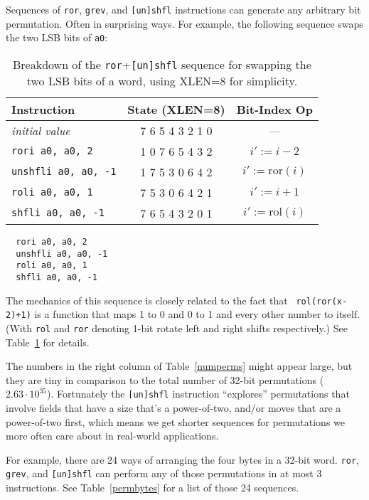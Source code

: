 Sequences of {\tt ror}, {\tt grev}, and {\tt [un]shfl} instructions can
generate any arbitrary bit permutation. Often in surprising ways. For example,
the following sequence swaps the two LSB bits of {\tt a0}:

\begin{table}[t]
\begin{center}
\begin{tabular}{l|c|c}
Instruction & State (XLEN=8) & Bit-Index Op \\
\hline
{\it initial value}      & 7 6 5 4 3 2 1 0 & --- \\
{\tt rori a0, a0, 2}     & 1 0 7 6 5 4 3 2 & $i' := i-2$ \\
{\tt unshfli a0, a0, -1} & 1 7 5 3 0 6 4 2 & $i' := \mathrm{ror}(i)$ \\
{\tt roli a0, a0, 1}     & 7 5 3 0 6 4 2 1 & $i' := i+1$ \\
{\tt shfli a0, a0, -1}   & 7 6 5 4 3 2 0 1 & $i' := \mathrm{rol}(i)$ \\
\end{tabular}
\end{center}
\caption{Breakdown of the {\tt ror}+{\tt [un]shfl} sequence for swapping the
two LSB bits of a word, using XLEN=8 for simplicity.}
\label{permdemo}
\end{table}

\begin{minipage}{\linewidth}
\begin{verbatim}
  rori a0, a0, 2
  unshfli a0, a0, -1
  roli a0, a0, 1
  shfli a0, a0, -1
\end{verbatim}
\end{minipage}

The mechanics of this sequence is closely related to the fact that {\tt
rol(ror(x-2)+1)} is a function that maps 1 to 0 and 0 to 1 and every other
number to itself. (With {\tt rol} and {\tt ror} denoting 1-bit rotate left and
right shifts respectively.) See Table~\ref{permdemo} for details.

The numbers in the right column of Table~\ref{numperms} might appear large,
but they are tiny in comparison to the total number of 32-bit permutations
($2.63\cdot10^{35}$). Fortunately the {\tt [un]shfl} instruction ``explores''
permutations that involve fields that have a size that's a power-of-two,
and/or moves that are a power-of-two first, which means we get shorter sequences
for permutations we more often care about in real-world applications.

For example, there are 24 ways of arranging the four bytes in a 32-bit word.
{\tt ror}, {\tt grev}, and {\tt [un]shfl} can perform any of those permutations
in at most 3 instructions. See Table~\ref{permbytes} for a list of those 24
sequences.

